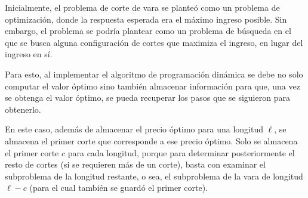 Inicialmente, el problema de corte de vara se planteó como un problema de optimización, donde la respuesta esperada era el máximo ingreso posible. Sin embargo, el problema se podría plantear como un problema de búsqueda en el que se busca alguna configuración de cortes que maximiza el ingreso, en lugar del ingreso en sí.
\begin{especificacion}
\end{especificacion}

Para esto, al implementar el algoritmo de programación dinámica se debe no solo computar el valor óptimo sino también almacenar información para que, una vez se obtenga el valor óptimo, se pueda recuperar los pasos que se siguieron para obtenerlo. 

En este caso, además de almacenar el precio óptimo para una longitud \(\ell\), se almacena el primer corte que corresponde a ese precio óptimo. Solo se almacena el primer corte \(c\) para cada longitud, porque para determinar posteriormente el resto de cortes (si se requieren más de un corte), basta con examinar el subproblema de la longitud restante, o sea, el subproblema de la vara de longitud \(\ell-c\) (para el cual también se guardó el primer corte).

